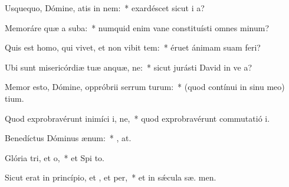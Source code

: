 \item Usquequo, Dómine, atis in nem:~* exardéscet sicut i  a?
\item Memoráre quæ a suba:~* numquid enim vane constituísti omnes  minum?
\item Quis est homo, qui vivet, et non vibit tem:~* éruet ánimam suam   feri?
\item Ubi sunt misericórdiæ tuæ anquæ, ne:~* sicut jurásti David in ve a?
\item Memor esto, Dómine, oppróbrii serrum turum:~* (quod contínui in sinu meo)  tium.
\item Quod exprobravérunt inimíci i, ne,~* quod exprobravérunt commutatió  i.
\item Benedíctus Dóminus  ænum:~* , at.
\item Glória tri, et o,~* et Spi to.
\item Sicut erat in princípio, et , et per,~* et in sǽcula sæ. men.
